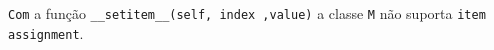 \documentclass[12pt,varwidth=16cm,border=1pt]{standalone}
\begin{document}
\verb+Com+ a função \verb+__setitem__(self, index ,value)+ a classe \verb+M+ não suporta \verb+item assignment+.

\questiomfalse
\end{document}
